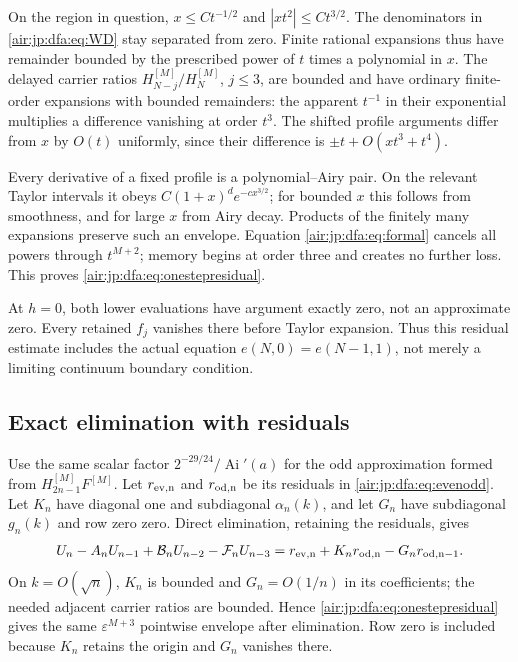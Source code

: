 \documentclass[11pt,letterpaper]{article}
\numberwithin{equation}{section}
\theoremstyle{remark}
\newcommand{\Ai}{\operatorname{Ai}}
\newcommand{\eps}{\varepsilon}
\begin{document}
On the region in question, $x\le Ct^{-1/2}$ and $|xt^2|\le Ct^{3/2}$. The denominators in \eqref{air:jp:dfa:eq:WD} stay separated from zero. Finite rational expansions thus have remainder bounded by the prescribed power of $t$ times a polynomial in $x$. The delayed carrier ratios $H_{N-j}^{[M]}/H_N^{[M]}$, $j\le3$, are bounded and have ordinary finite-order expansions with bounded remainders: the apparent $t^{-1}$ in their exponential multiplies a difference vanishing at order $t^3$. The shifted profile arguments differ from $x$ by $O(t)$ uniformly, since their difference is $\pm t+O(xt^3+t^4)$.

Every derivative of a fixed profile is a polynomial--Airy pair. On the relevant Taylor intervals it obeys $C(1+x)^d e^{-cx^{3/2}}$; for bounded $x$ this follows from smoothness, and for large $x$ from Airy decay. Products of the finitely many expansions preserve such an envelope. Equation \eqref{air:jp:dfa:eq:formal} cancels all powers through $t^{M+2}$; memory begins at order three and creates no further loss. This proves \eqref{air:jp:dfa:eq:onestepresidual}.

At $h=0$, both lower evaluations have argument exactly zero, not an approximate zero. Every retained $f_j$ vanishes there before Taylor expansion. Thus this residual estimate includes the actual equation $e(N,0)=e(N-1,1)$, not merely a limiting continuum boundary condition.

\subsection{Exact elimination with residuals}
Use the same scalar factor $2^{-29/24}/\Ai'(a)$ for the odd approximation formed from $H_{2n-1}^{[M]}F^{[M]}$. Let $r_{\rm ev,n}$ and $r_{\rm od,n}$ be its residuals in \eqref{air:jp:dfa:eq:evenodd}. Let $K_n$ have diagonal one and subdiagonal $\alpha_n(k)$, and let $G_n$ have subdiagonal $g_n(k)$ and row zero zero. Direct elimination, retaining the residuals, gives
\begin{align}
 U_n-A_nU_{n-1}+\mathcal B_nU_{n-2}-\mathcal F_nU_{n-3}
 =r_{\rm ev,n}+K_nr_{\rm od,n}-G_nr_{\rm od,n-1}.\label{air:jp:dfa:eq:eliminateresidual}
\end{align}
On $k=O(\sqrt n)$, $K_n$ is bounded and $G_n=O(1/n)$ in its coefficients; the needed adjacent carrier ratios are bounded. Hence \eqref{air:jp:dfa:eq:onestepresidual} gives the same $\eps^{M+3}$ pointwise envelope after elimination. Row zero is included because $K_n$ retains the origin and $G_n$ vanishes there.
\end{document}
